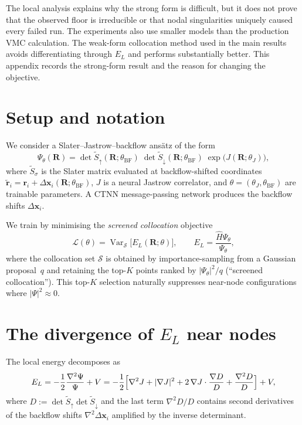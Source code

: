 The local analysis explains why the strong form is difficult, but it does not prove that
the observed floor is irreducible or that nodal singularities uniquely caused every failed
run. The experiments also use smaller models than the production VMC calculation. The
weak-form collocation method used in the main results avoids differentiating through $E_L$
and performs substantially better. This appendix records the strong-form result and the
reason for changing the objective.

\section{Setup and notation}
\label{app:catch22:setup}

We consider a Slater--Jastrow--backflow ans\"atz of the form
\begin{equation}
\Psi_\theta(\mathbf R)
=\det\tilde S_\uparrow(\mathbf R;\theta_{\mathrm{BF}})
 \;\det\tilde S_\downarrow(\mathbf R;\theta_{\mathrm{BF}})
 \;\exp\bigl(J(\mathbf R;\theta_J)\bigr),
\label{eq:c22:ansatz}
\end{equation}
where $\tilde S_\sigma$ is the Slater matrix evaluated at backflow-shifted
coordinates $\tilde{\mathbf r}_i = \mathbf r_i + \Delta\mathbf
x_i(\mathbf R;\theta_{\mathrm{BF}})$, $J$ is a neural Jastrow correlator, and $\theta=(\theta_J,\theta_{\mathrm{BF}})$ are trainable
parameters.
A CTNN message-passing network produces the backflow shifts $\Delta\mathbf x_i$.

We train by minimising the \emph{screened collocation} objective
\begin{equation}
\mathcal L(\theta)
=\operatorname{Var}_{\mathcal S}\!\bigl[E_L(\mathbf R;\theta)\bigr],
\qquad
E_L=\frac{\hat H\Psi_\theta}{\Psi_\theta},
\label{eq:c22:loss}
\end{equation}
where the collocation set $\mathcal S$ is obtained by
importance-sampling from a Gaussian proposal~$q$
and retaining the top-$K$ points ranked by $|\Psi_\theta|^2/q$
(``screened collocation'').
This top-$K$ selection naturally suppresses near-node configurations
where $|\Psi|^2\approx 0$.


\section{The divergence of $E_L$ near nodes}
\label{app:catch22:divergence}

The local energy decomposes as
\begin{equation}
E_L
= -\frac12\frac{\nabla^2\Psi}{\Psi}+V
= -\frac12\Bigl[
  \nabla^2 J + |\nabla J|^2
  + 2\,\nabla J\cdot\frac{\nabla D}{D}
  + \frac{\nabla^2 D}{D}
\Bigr]+V,
\label{eq:c22:EL_decomp}
\end{equation}
where $D:=\det\tilde S_\uparrow\det\tilde S_\downarrow$ and
the last term $\nabla^2 D/D$ contains second derivatives of the
backflow shifts $\nabla^2\Delta\mathbf x_i$ amplified by the
inverse determinant.

